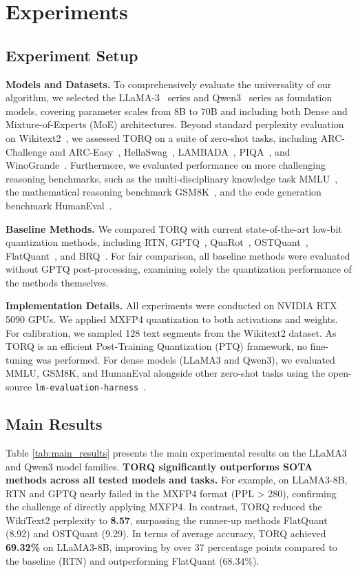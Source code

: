 \section{Experiments}
\label{sec:experiments}

\subsection{Experiment Setup}

\textbf{Models and Datasets.} To comprehensively evaluate the universality of our algorithm, we selected the LLaMA-3~\cite{llama3} series and Qwen3~\cite{qwen3} series as foundation models, covering parameter scales from 8B to 70B and including both Dense and Mixture-of-Experts (MoE) architectures. Beyond standard perplexity evaluation on Wikitext2~\cite{wikitext2}, we assessed TORQ on a suite of zero-shot tasks, including ARC-Challenge and ARC-Easy~\cite{arc}, HellaSwag~\cite{hellaswag}, LAMBADA~\cite{lambada}, PIQA~\cite{piqa}, and WinoGrande~\cite{winogrande}. Furthermore, we evaluated performance on more challenging reasoning benchmarks, such as the multi-disciplinary knowledge task MMLU~\cite{mmlu}, the mathematical reasoning benchmark GSM8K~\cite{gsm8k}, and the code generation benchmark HumanEval~\cite{humaneval}.

\textbf{Baseline Methods.} We compared TORQ with current state-of-the-art low-bit quantization methods, including RTN, GPTQ~\cite{gptq}, QuaRot~\cite{quarot}, OSTQuant~\cite{ostquant}, FlatQuant~\cite{flatquant}, and BRQ~\cite{brq}. For fair comparison, all baseline methods were evaluated without GPTQ post-processing, examining solely the quantization performance of the methods themselves.

\textbf{Implementation Details.} All experiments were conducted on NVIDIA RTX 5090 GPUs. We applied MXFP4 quantization to both activations and weights. For calibration, we sampled 128 text segments from the Wikitext2 dataset. As TORQ is an efficient Post-Training Quantization (PTQ) framework, no fine-tuning was performed. For dense models (LLaMA3 and Qwen3), we evaluated MMLU, GSM8K, and HumanEval alongside other zero-shot tasks using the open-source \texttt{lm-evaluation-harness}~\cite{lm_eval}.

\subsection{Main Results}

Table \ref{tab:main_results} presents the main experimental results on the LLaMA3 and Qwen3 model families. \textbf{TORQ significantly outperforms SOTA methods across all tested models and tasks.} 
For example, on LLaMA3-8B, RTN and GPTQ nearly failed in the MXFP4 format (PPL > 280), confirming the challenge of directly applying MXFP4. In contrast, TORQ reduced the WikiText2 perplexity to \textbf{8.57}, surpassing the runner-up methods FlatQuant (8.92) and OSTQuant (9.29). In terms of average accuracy, TORQ achieved \textbf{69.32\%} on LLaMA3-8B, improving by over 37 percentage points compared to the baseline (RTN) and outperforming FlatQuant (68.34\%).

